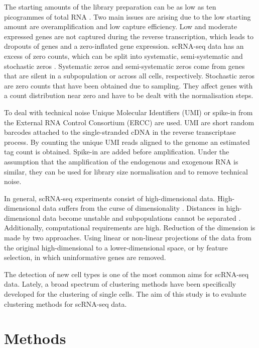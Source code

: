 \documentclass[11pt, a4paper]{article}\usepackage[]{graphicx}\usepackage[]{color}
\begin{document}
The starting amounts of the library preparation can be as low as ten picogrammes of total RNA \citep{picelli2013smart}. Two main issues are arising due to the low starting amount are  overamplification and low capture efficiency. Low and moderate expressed genes are not captured during the reverse transcription, which leads to dropouts of genes and a zero-inflated gene expression. scRNA-seq data has an excess of zero counts, which can be split into systematic, semi-systematic and stochastic zeros \citep{lun2016pooling}. Systematic zeros and semi-systematic zeros come from genes that are silent in a subpopulation or across all cells, respectively. 
Stochastic zeros are zero counts that have been obtained due to sampling. They affect genes with a count distribution near zero and have to be dealt with the normalisation steps.  
 
To deal with technical noise Unique Molecular Identifiers (UMI) or spike-in from the External RNA Control Consortium  (ERCC) are used. UMI are short random barcodes attached to the single-stranded cDNA in the reverse transcriptase process. By counting the unique UMI reads aligned to the genome an estimated tag count is obtained. Spike-in are added before amplification. Under the assumption that the amplification of the endogenous and exogenous RNA is similar, they can be used for library size normalisation and to remove technical noise. 

In general, scRNA-seq experiments consist of high-dimensional data. High-dimensional data suffers from the curse of dimensionality \citep{wagner2016revealing}. Distances in high-dimensional data become unstable and subpopulations cannot be separated \citep{andrews2017identifying}. Additionally, computational requirements are high. Reduction of the dimension is made by two approaches. Using linear or non-linear projections of the data from the original high-dimensional to a lower-dimensional space, or by feature selection, in which uninformative genes are removed.

The detection of new cell types is one of the most common aims for scRNA-seq data. Lately, a broad spectrum of clustering methods have been specifically developed for the clustering of single cells.
The aim of this study is to evaluate clustering methods for scRNA-seq data. 
\section{Methods}
\end{document}
